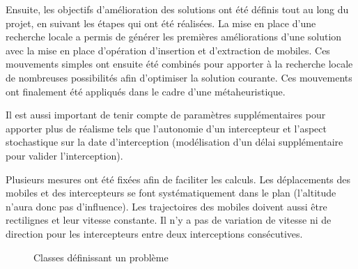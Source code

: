 		Ensuite, les objectifs d'amélioration des solutions ont été définis tout au long du projet, en suivant les étapes qui ont été réalisées. La mise en place d'une recherche locale a permis de générer les premières améliorations d'une solution avec la mise en place d'opération d'insertion et d'extraction de mobiles. Ces mouvements simples ont ensuite été combinés pour apporter à la recherche locale de nombreuses possibilités afin d'optimiser la solution courante. Ces mouvements ont finalement été appliqués dans le cadre d'une métaheuristique.
		
		Il est aussi important de tenir compte de paramètres supplémentaires pour apporter plus de réalisme tels que l'autonomie d'un intercepteur et l'aspect stochastique sur la date d'interception (modélisation d'un délai supplémentaire pour valider l'interception).
		
		
		Plusieurs mesures ont été fixées afin de faciliter les calculs. Les déplacements des mobiles et des intercepteurs se font systématiquement dans le plan (l'altitude n'aura donc pas d'influence). Les trajectoires des mobiles doivent aussi être rectilignes et leur vitesse constante. Il n'y a pas de variation de vitesse ni de direction pour les intercepteurs entre deux interceptions consécutives.

		\begin{figure}[h!]
			\centering
			\begin{tikzpicture}
				
			\end{tikzpicture}
			\caption{Classes définissant un problème}
			\label{fig:problem-uml}
		\end{figure}


